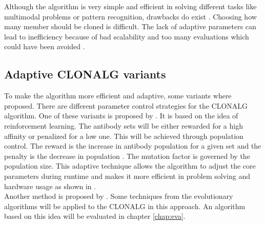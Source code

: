 Although the algorithm is very simple and efficient in solving different tasks like multimodal problems or pattern recognition, drawbacks do exist \cite{Garret04}. Choosing how many member should be cloned is difficult. The lack of adaptive parameters can lead to inefficiency because of bad scalability and too many evaluations which could have been avoided \cite{Garret04}.
\subsection{Adaptive CLONALG variants}
To make the algorithm more efficient and adaptive, some variants where proposed. There are different parameter control strategies for the CLONALG algorithm. One of these variants is proposed by \cite{RIFF09}. It is based on the idea of reinforcement learning. The antibody sets will be either rewarded for a high affinity or penalized for a low one. This will be achieved through population control. The reward is the increase in antibody population for a given set and the penalty is the decrease in population \cite{RIFF09}. The mutation factor is governed by the population size. This adaptive technique allows the algorithm to adjust the core parameters during runtime and makes it more efficient in problem solving and hardware usage as shown in \cite{RIFF09}.\\
Another method is proposed by \cite{Garret04}. Some techniques from the evolutionary algorithms will be applied to the CLONALG in this approach. An algorithm based on this idea will be evaluated in chapter \ref{chap:eva}.
 




